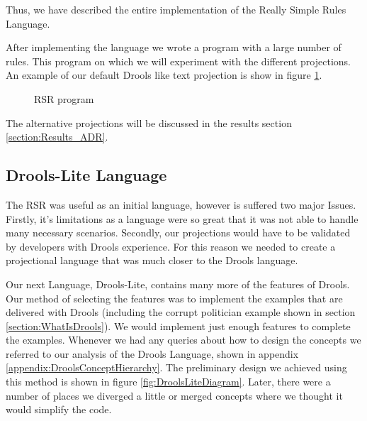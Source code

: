 Thus, we have described the entire implementation of the Really Simple Rules Language.

After implementing the language we wrote a program with a large number of rules.
This program on which we will experiment with the different projections.
An example of our default Drools like text projection is show in figure \ref{fig:RSRProgram}.

\begin{figure}[h]
    \centering
    \caption{RSR program}
    \label{fig:RSRProgram}
\end{figure}

The alternative projections will be discussed in the results section \ref{section:Results_ADR}.

\subsection{Drools-Lite Language}

The RSR was useful as an initial language, however is suffered two major Issues.
Firstly, it's limitations as a language were so great that it was not able to handle many necessary scenarios.
Secondly, our projections would have to be validated by developers with Drools experience.
For this reason we needed to create a projectional language that was much closer to the Drools language.

Our next Language, Drools-Lite, contains many more of the features of Drools.
Our method of selecting the features was to implement the examples that are delivered with Drools (including the corrupt politician example shown in section \ref{section:WhatIsDrools}).
We would implement just enough features to complete the examples.
Whenever we had any queries about how to design the concepts we referred to our analysis of the Drools Language, shown in appendix \ref{appendix:DroolsConceptHierarchy}.
The preliminary design we achieved using this method is shown in figure \ref{fig:DroolsLiteDiagram}.
Later, there were a number of places we diverged a little or merged concepts where we thought it would simplify the code.

